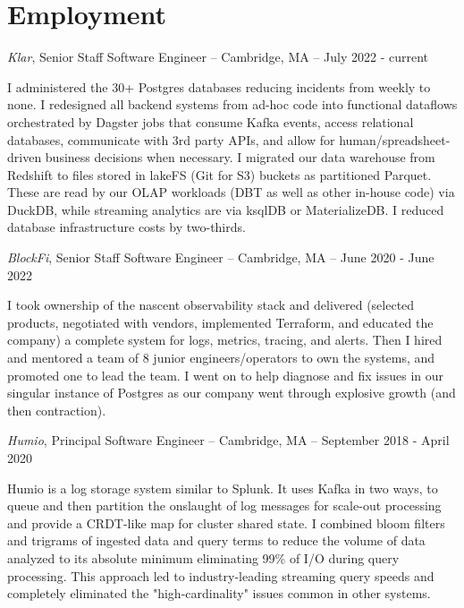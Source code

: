 \documentclass[letterpaper]{article}
\renewenvironment{itemize}{
  \begin{list}{}{
    \setlength{\leftmargin}{1.5em}
  }
}{
  \end{list}
}
\begin{document}
\section*{Employment}

\begin{itemize}

\item {\it Klar}, Senior Staff Software Engineer -- Cambridge, MA -- July 2022 - current

I administered the 30+ Postgres databases reducing incidents from weekly to none.  I redesigned all backend systems from ad-hoc code into functional dataflows orchestrated by Dagster jobs that consume Kafka events, access relational databases, communicate with 3rd party APIs, and allow for human/spreadsheet-driven business decisions when necessary.  I migrated our data warehouse from Redshift to files stored in lakeFS (Git for S3) buckets as partitioned Parquet. These are read by our OLAP workloads (DBT as well as other in-house code) via DuckDB, while streaming analytics are via ksqlDB or MaterializeDB. I reduced database infrastructure costs by two-thirds.

\item {\it BlockFi}, Senior Staff Software Engineer -- Cambridge, MA -- June 2020 - June 2022

I took ownership of the nascent observability stack and delivered (selected products, negotiated with vendors, implemented Terraform, and educated the company) a complete system for logs, metrics, tracing, and alerts.  Then I hired and mentored a team of 8 junior engineers/operators to own the systems, and promoted one to lead the team. I went on to help diagnose and fix issues in our singular instance of Postgres as our company went through explosive growth (and then contraction).

\item {\it Humio}, Principal Software Engineer -- Cambridge, MA -- September 2018 - April 2020

Humio is a log storage system similar to Splunk.  It uses Kafka in two ways, to queue and then partition the onslaught of log messages for scale-out processing and provide a CRDT-like map for cluster shared state.  I combined bloom filters and trigrams of ingested data and query terms to reduce the volume of data analyzed to its absolute minimum eliminating 99\% of I/O during query processing. This approach led to industry-leading streaming query speeds and completely eliminated the "high-cardinality" issues common in other systems.


\end{itemize}
\end{document}
